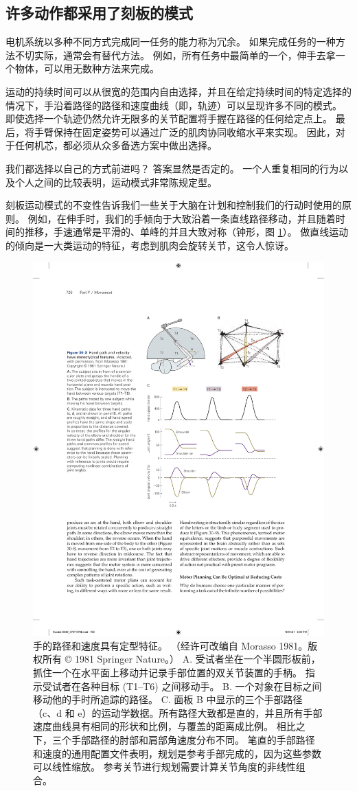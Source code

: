 \subsection{许多动作都采用了刻板的模式}

电机系统以多种不同方式完成同一任务的能力称为冗余。 如果完成任务的一种方法不切实际，通常会有替代方法。 例如，所有任务中最简单的一个，伸手去拿一个物体，可以用无数种方法来完成。

运动的持续时间可以从很宽的范围内自由选择，并且在给定持续时间的特定选择的情况下，手沿着路径的路径和速度曲线（即，轨迹）可以呈现许多不同的模式。 即使选择一个轨迹仍然允许无限多的关节配置将手握在路径的任何给定点上。 最后，将手臂保持在固定姿势可以通过广泛的肌肉协同收缩水平来实现。 因此，对于任何机芯，都必须从众多备选方案中做出选择。

我们都选择以自己的方式前进吗？ 答案显然是否定的。 一个人重复相同的行为以及个人之间的比较表明，运动模式非常陈规定型。

刻板运动模式的不变性告诉我们一些关于大脑在计划和控制我们的行动时使用的原则。 
例如，在伸手时，我们的手倾向于大致沿着一条直线路径移动，并且随着时间的推移，手速通常是平滑的、单峰的并且大致对称（钟形，图 \ref{fig:30_8}）。 
做直线运动的倾向是一大类运动的特征，考虑到肌肉会旋转关节，这令人惊讶。

\begin{figure}[htbp]
	\centering
	\includegraphics[width=0.7\linewidth]{chap30/fig_30_8}
	\caption{手的路径和速度具有定型特征。 （经许可改编自 Morasso 1981。版权所有 © 1981 Springer Nature。） A. 受试者坐在一个半圆形板前，抓住一个在水平面上移动并记录手部位置的双关节装置的手柄。 指示受试者在各种目标 (T1–T6) 之间移动手。 B. 一个对象在目标之间移动他的手时所追踪的路径。 C. 面板 B 中显示的三个手部路径（c、d 和 e）的运动学数据。所有路径大致都是直的，并且所有手部速度曲线具有相同的形状和比例，与覆盖的距离成比例。 相比之下，三个手部路径的肘部和肩部角速度分布不同。 笔直的手部路径和速度的通用配置文件表明，规划是参考手部完成的，因为这些参数可以线性缩放。 参考关节进行规划需要计算关节角度的非线性组合。}
	\label{fig:30_8}
\end{figure}

